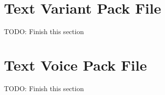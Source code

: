\section{Text Variant Pack File}
\label{sec:pftxtV}

TODO: Finish this section

\clearpage

\section{Text Voice Pack File}
\label{sec:pftxtv}

TODO: Finish this section

\clearpage

